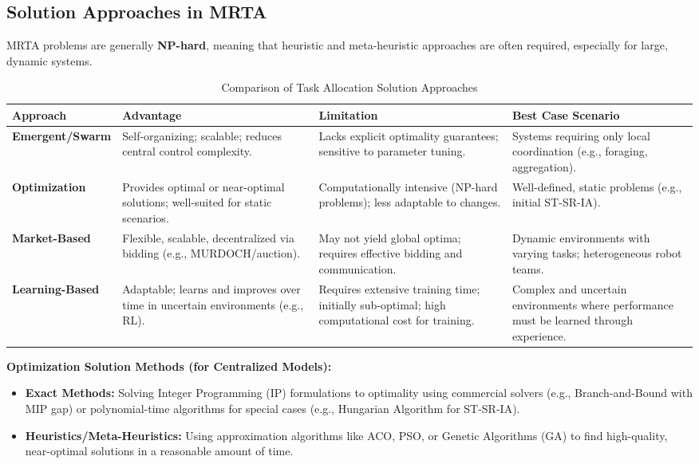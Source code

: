 \documentclass{report}
\begin{document}
\subsection*{Solution Approaches in MRTA}

MRTA problems are generally \textbf{NP-hard}, meaning that heuristic and meta-heuristic approaches are often required, especially for large, dynamic systems.

\renewcommand{\arraystretch}{1.2}
\begin{table}[h]
    \centering
    \caption{Comparison of Task Allocation Solution Approaches}
    \begin{tabular}{|m{2cm}|m{4cm}|m{4cm}|m{2.5cm}|}
    \hline
    \textbf{Approach} & \textbf{Advantage} & \textbf{Limitation} & \textbf{Best Case Scenario} \\
    \hline
    \textbf{Emergent/Swarm} & Self-organizing; scalable; reduces central control complexity. & Lacks explicit optimality guarantees; sensitive to parameter tuning. & Systems requiring only local coordination (e.g., foraging, aggregation). \\
    \hline
    \textbf{Optimization} & Provides optimal or near-optimal solutions; well-suited for static scenarios. & Computationally intensive (NP-hard problems); less adaptable to changes. & Well-defined, static problems (e.g., initial ST-SR-IA). \\
    \hline
    \textbf{Market-Based} & Flexible, scalable, decentralized via bidding (e.g., MURDOCH/auction). & May not yield global optima; requires effective bidding and communication. & Dynamic environments with varying tasks; heterogeneous robot teams. \\
    \hline
    \textbf{Learning-Based} & Adaptable; learns and improves over time in uncertain environments (e.g., RL). & Requires extensive training time; initially sub-optimal; high computational cost for training. & Complex and uncertain environments where performance must be learned through experience. \\
    \hline
    \end{tabular}
    \label{tab:mrta_approaches}
\end{table}

\textbf{Optimization Solution Methods (for Centralized Models):}
\begin{itemize}
    \item \textbf{Exact Methods:} Solving Integer Programming (IP) formulations to optimality using commercial solvers (e.g., Branch-and-Bound with MIP gap) or polynomial-time algorithms for special cases (e.g., Hungarian Algorithm for ST-SR-IA).
    \item \textbf{Heuristics/Meta-Heuristics:} Using approximation algorithms like ACO, PSO, or Genetic Algorithms (GA) to find high-quality, near-optimal solutions in a reasonable amount of time.
\end{itemize}
\end{document}
